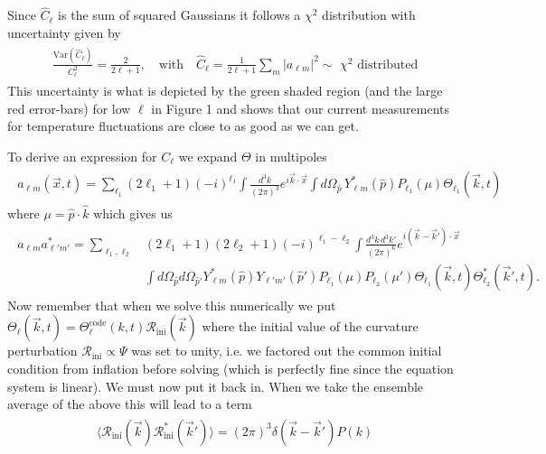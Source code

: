 Since $\hat{C}_\ell$ is the sum of squared Gaussians it follows a $\chi^2$ distribution with uncertainty given by
{\small\begin{align}
\begin{aligned}
    \frac{\mathrm{Var}(\hat{C}_{\ell})}{C_{\ell}^{2}}=\frac{2}{2\ell+1}, \quad\text{with}\quad \hat{C}_{\ell}=\frac{1}{2\ell+1}\sum_{m}|a_{\ell m}|^{2} \sim \,\,\chi^2 \text{ distributed}
\end{aligned}
\end{align}}
This uncertainty is what is depicted by the green shaded region (and the large red error-bars) for low $\ell$ in Figure 1 and shows that our current measurements for temperature fluctuations are close to as good as we can get.

To derive an expression for $C_{\ell}$ we expand $\Theta$ in multipoles
{\small\begin{align}
\begin{aligned}
    a_{\ell m}(\vec{x}, t)=\sum_{\ell_{1}} (2\ell_{1}+1)(-i)^{\ell_{1}} \int \frac{d^{3}k}{(2\pi)^{3}} e^{i\vec{k}\cdot \vec{x}} \int d\Omega_{\hat{p}}\, Y_{\ell m}^{*}(\hat{p}) P_{\ell_{1}}(\mu)\Theta_{\ell_{1}}(\vec{k}, t)
\end{aligned}
\end{align}}
where $\mu=\hat{p}\cdot \hat{k}$ which gives us
{\small\begin{align}
\begin{aligned}
    a_{\ell m}a_{\ell' m'}^{*}=\sum_{\ell_{1},\ell_{2}} &(2\ell_{1}+1)(2\ell_{2}+1)(-i)^{\ell_{1}-\ell_{2}} \int \frac{d^{3}k\, d^{3}k'}{(2\pi)^{6}} e^{i(\vec{k}-\vec{k}')\cdot \vec{x}}\\
    &\int d\Omega_{\hat{p}} d\Omega_{\hat{p}'}Y_{\ell m}^{*}(\hat{p})Y_{\ell' m'}(\hat{p}')P_{\ell_{1}}(\mu)P_{\ell_{2}}(\mu')\Theta_{\ell_{1}}(\vec{k}, t)\Theta_{\ell_{2}}^{*}(\vec{k}', t).
\end{aligned}
\end{align}}
Now remember that when we solve this numerically we put $\Theta_{\ell}(\vec{k}, t)=\Theta_{\ell}^{\mathrm{code}}(k, t)\mathcal{R}_{\mathrm{ini}}(\vec{k})$ where the initial value of the curvature perturbation $\mathcal{R}_{\mathrm{ini}}\propto \Psi$ was set to unity, i.e. we factored out the common initial condition from inflation before solving (which is perfectly fine since the equation system is linear).
We must now put it back in.
When we take the ensemble average of the above this will lead to a term
{\small\begin{align}
\begin{aligned}
    \langle \mathcal{R}_{\mathrm{ini}}(\vec{k})\mathcal{R}_{\mathrm{ini}}^{*}(\vec{k}')\rangle =(2\pi)^{3}\delta(\vec{k}-\vec{k}')P(k)
\end{aligned}
\end{align}}
